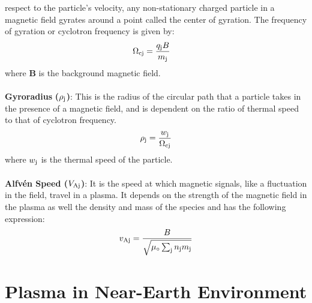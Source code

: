         respect to the particle's velocity, any non-stationary charged particle in a magnetic field
        gyrates around a point called the center of gyration. The frequency of gyration or cyclotron
        frequency is given by:
        \begin{align}
            \Omega_{\rm cj} & = \frac{q_{\rm j} B}{m_{\rm j}} \label{eq:cyclf}
        \end{align}
        where \textbf{B} is the background magnetic field. \\
        \\
        \textbf{Gyroradius }\textbf{($\rho_{\rm j}$)}: This is the radius of the circular path that a particle takes in
        the presence of a magnetic field, and is dependent on the ratio of thermal speed to that of
        cyclotron frequency.
        \begin{align}
            \rho_{\rm j} = \frac{w_{\rm j}}{\Omega_{\rm cj}} \label{eq:rho}
        \end{align}
        where $w_{\rm j}$ is the thermal speed of the particle. \\
        \\
        \textbf{Alfv\'en Speed  ($V_{\rm Aj}$)}: It is the speed at which magnetic signals, like a
        fluctuation in the field, travel in a plasma. It depends on the strength of the magnetic
        field in the plasma as well the density and mass of the species and has the following
        expression:
        \begin{align}
            v_{\rm Aj} = \frac{B}{\sqrt{\mu_\circ \sum_{\rm j} n_{\rm j} m_{\rm j}}} \label{eq:alfv}
        \end{align}

    \section{Plasma in Near-Earth Environment} \label{sec:plas2}

